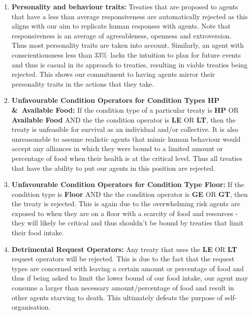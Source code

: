 \begin{enumerate}
    \item 
    \textbf{Personality and behaviour traits:} \newline
    Treaties that are proposed to agents that have a less than average responsiveness are automatically rejected as this aligns with our aim to replicate human responses with agents. Note that responsiveness is an average of agreeableness, openness and extroversion. Thus most personality traits are taken into account. Similarly, an agent with conscientiousness less than 33\%\ lacks the intuition to plan for future events and thus is casual in its approach to treaties, resulting in viable treaties being rejected. This shows our commitment to having agents mirror their personality traits in the actions that they take.
    
    \item 
    \textbf{Unfavourable Condition Operators for Condition Types HP \&\ Available Food:} \newline
    If the condition type of a particular treaty is \textbf{HP} OR \textbf{Available Food} AND the the condition operator is \textbf{LE} OR \textbf{LT}, then the treaty is unfeasible for survival as an individual and/or collective. It is also unreasonable to assume realistic agents that mimic human behaviour would accept any alliances in which they were bound to a limited amount or percentage of food when their health is at the critical level. Thus all treaties that have the ability to put our agents in this position are rejected.
    
    \item 
    \textbf{Unfavourable Condition Operators for Condition Type Floor:} \newline
    If the condition type is \textbf{Floor} AND the the condition operator is \textbf{GE} OR \textbf{GT}, then the treaty is rejected. This is again due to the overwhelming risk agents are exposed to when they are on a floor with a scarcity of food and resources - they will likely be critical and thus shouldn't be bound by treaties that limit their food intake.
    
    \item 
    \textbf{Detrimental Request Operators:}\newline
    Any treaty that uses the \textbf{LE} OR \textbf{LT} request operators will be rejected. This is due to the fact that the request types are concerned with leaving a certain amount or percentage of food and thus if being asked to limit the lower bound of our food intake, our agent may consume a larger than necessary amount/percentage of food and result in other agents starving to death. This ultimately defeats the purpose of self-organisation.
    

\end{enumerate}
